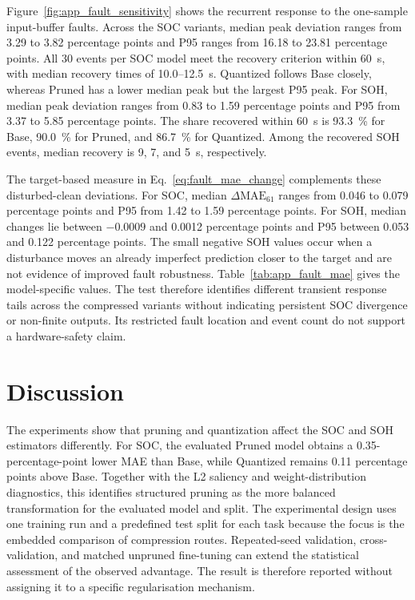 \documentclass[final,3p,times]{elsarticle}
\begin{document}
Figure~\ref{fig:app_fault_sensitivity} shows the recurrent response to the one-sample input-buffer faults. Across the SOC variants, median peak deviation ranges from 3.29 to 3.82 percentage points and P95 ranges from 16.18 to 23.81 percentage points. All 30 events per SOC model meet the recovery criterion within 60~s, with median recovery times of 10.0--12.5~s. Quantized follows Base closely, whereas Pruned has a lower median peak but the largest P95 peak. For SOH, median peak deviation ranges from 0.83 to 1.59 percentage points and P95 from 3.37 to 5.85 percentage points. The share recovered within 60~s is 93.3~\% for Base, 90.0~\% for Pruned, and 86.7~\% for Quantized. Among the recovered SOH events, median recovery is 9, 7, and 5~s, respectively.

The target-based measure in Eq.~\ref{eq:fault_mae_change} complements these disturbed-clean deviations. For SOC, median $\Delta\mathrm{MAE}_{61}$ ranges from 0.046 to 0.079 percentage points and P95 from 1.42 to 1.59 percentage points. For SOH, median changes lie between $-0.0009$ and 0.0012 percentage points and P95 between 0.053 and 0.122 percentage points. The small negative SOH values occur when a disturbance moves an already imperfect prediction closer to the target and are not evidence of improved fault robustness. Table~\ref{tab:app_fault_mae} gives the model-specific values. The test therefore identifies different transient response tails across the compressed variants without indicating persistent SOC divergence or non-finite outputs. Its restricted fault location and event count do not support a hardware-safety claim.

\section{Discussion}
The experiments show that pruning and quantization affect the SOC and SOH estimators differently. For SOC, the evaluated Pruned model obtains a 0.35-percentage-point lower MAE than Base, while Quantized remains 0.11 percentage points above Base. Together with the L2 saliency and weight-distribution diagnostics, this identifies structured pruning as the more balanced transformation for the evaluated model and split. The experimental design uses one training run and a predefined test split for each task because the focus is the embedded comparison of compression routes. Repeated-seed validation, cross-validation, and matched unpruned fine-tuning can extend the statistical assessment of the observed advantage. The result is therefore reported without assigning it to a specific regularisation mechanism.
\end{document}
